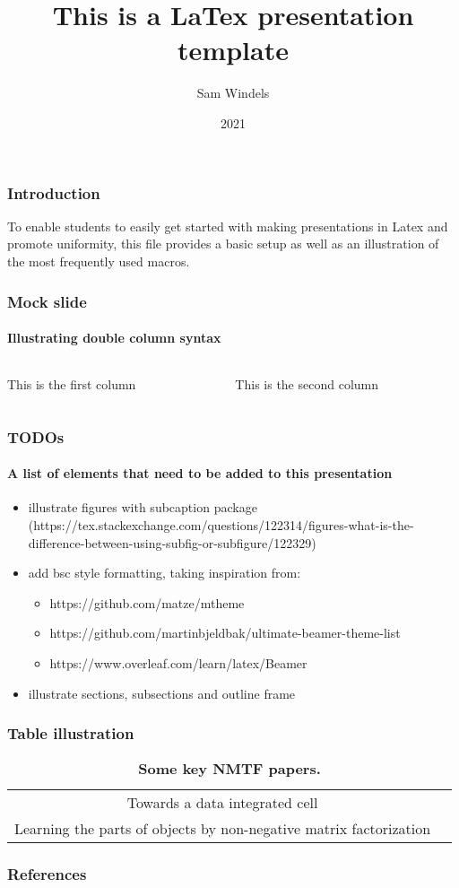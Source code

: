 \documentclass{beamer}
\title{This is a LaTex presentation template }
\author{Sam Windels}
\institute{College of Lore}
\date{2021}
\begin{document}
\frame{\titlepage}

\begin{frame}
\frametitle{Introduction}

To enable students to easily get started with making presentations in Latex and
promote uniformity, this file provides a basic setup as well as an illustration
of the most frequently used macros.  

\end{frame}


\begin{frame}[t]
	\frametitle{Mock slide}
	\framesubtitle{Illustrating double column syntax}
	\begin{columns}
		\begin{column}{0.5\textwidth}
			This is the first column
		\end{column}
		\begin{column}{0.5\textwidth}
			This is the second column
		\end{column}
	\end{columns}
\end{frame}

\begin{frame}[t]
	\frametitle{TODOs}
	\framesubtitle{A list of elements that need to be added to this presentation}
	\begin{itemize}
		\item illustrate figures with subcaption package (https://tex.stackexchange.com/questions/122314/figures-what-is-the-difference-between-using-subfig-or-subfigure/122329)
		\item add bsc style formatting, taking inspiration from:
		\begin{itemize}
			\item https://github.com/matze/mtheme
				\item https://github.com/martinbjeldbak/ultimate-beamer-theme-list
				\item https://www.overleaf.com/learn/latex/Beamer 
			\end{itemize}
	\item illustrate sections, subsections and outline frame 
	\end{itemize}
\end{frame}

\begin{frame}[t]
	\frametitle{Table illustration}

	\begin{table}[htpb]
		\centering
		\begin{tabular}{cc}
			Towards a data integrated cell & \cite{malod2019towards}	\\
			Learning the parts of objects by non-negative matrix factorization & \cite{Lee1999}	
		\end{tabular}
		\caption{{\bf Some key NMTF papers.}}
		\label{tab:table}
	\end{table}	
\end{frame}

\begin{frame}[t, allowframebreaks] %
	\frametitle{References}
	
	\printbibliography

\end{frame}
\end{document}
